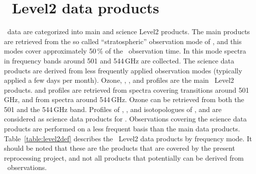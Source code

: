 \section{\smr\ Level2 data products}

\smr\ data are categorized into main and science Level2 products.
The main products are retrieved from the so called ``stratospheric'' observation mode
of \smr, and this modes cover approximately 50\,\(\%\) of the \smr\ observation time.
In this mode spectra in frequency bands around 501 and 544\,GHz are collected.
The science data products are derived from less frequently applied observation modes
(typically applied a few days per month).
Ozone, , , and  profiles
are the main \smr\ Level2 products.
 and  profiles are retrieved from spectra covering
transitions around 501\,GHz, and  from spectra around 544\,GHz.
Ozone can be retrieved from both the 501 and the 544\,GHz band.
Profiles of , ,  and
isotopologues of , and 
are considered as science data products for \smr.
Observations covering the science data products are performed on a less 
frequent basis than the main data products. 
Table~\ref{table:level2def} describes the \smr\ Level2 data products
by frequency mode. It should be noted that these are the products
that are covered by the present reprocessing project, and not all
products that potentially can be derived from \smr\ observations.
